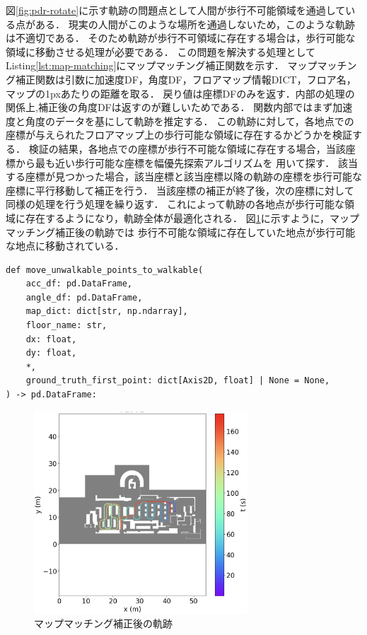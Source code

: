 
図\ref{fig:pdr-rotate}に示す軌跡の問題点として人間が歩行不可能領域を通過している点がある．
現実の人間がこのような場所を通過しないため，このような軌跡は不適切である．
そのため軌跡が歩行不可領域に存在する場合は，歩行可能な領域に移動させる処理が必要である．
この問題を解決する処理としてListing\ref{lst:map-matching}にマップマッチング補正関数を示す．
マップマッチング補正関数は引数に加速度DF，角度DF，フロアマップ情報DICT，フロア名，マップの1pxあたりの距離を取る．
戻り値は座標DFのみを返す．内部の処理の関係上,補正後の角度DFは返すのが難しいためである．
関数内部ではまず加速度と角度のデータを基にして軌跡を推定する．
この軌跡に対して，各地点での座標が与えられたフロアマップ上の歩行可能な領域に存在するかどうかを検証する．
検証の結果，各地点での座標が歩行不可能な領域に存在する場合，当該座標から最も近い歩行可能な座標を幅優先探索アルゴリズムを
用いて探す．
該当する座標が見つかった場合，該当座標と該当座標以降の軌跡の座標を歩行可能な座標に平行移動して補正を行う．
当該座標の補正が終了後，次の座標に対して同様の処理を行う処理を繰り返す．
これによって軌跡の各地点が歩行可能な領域に存在するようになり，軌跡全体が最適化される．
図\ref{fig:map-matching}に示すように，マップマッチング補正後の軌跡では
歩行不可能な領域に存在していた地点が歩行可能な地点に移動されている．


\begin{lstlisting}[caption={マップマッチング補正}, label=lst:map-matching]
def move_unwalkable_points_to_walkable(
    acc_df: pd.DataFrame,
    angle_df: pd.DataFrame,
    map_dict: dict[str, np.ndarray],
    floor_name: str,
    dx: float,
    dy: float,
    *,
    ground_truth_first_point: dict[Axis2D, float] | None = None,
) -> pd.DataFrame:

\end{lstlisting}

\begin{figure}[h]
	\centering
	\includegraphics[width=80mm]{image/map-matching.jpg}
	\caption{マップマッチング補正後の軌跡}    \label{fig:map-matching}
\end{figure}
